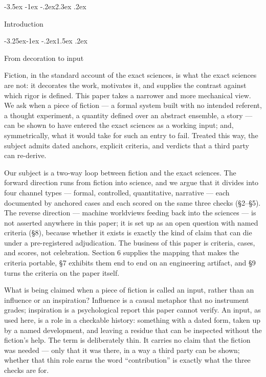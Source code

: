\documentclass[11pt,a4paper]{article}
\makeatletter
\renewcommand\section{\@startsection{section}{1}{\z@}%
  {-3.5ex \@plus -1ex \@minus -.2ex}{2.3ex \@plus .2ex}%
  {\normalfont\Large\bfseries\raggedright}}
\renewcommand\subsection{\@startsection{subsection}{2}{\z@}%
  {-3.25ex\@plus -1ex \@minus -.2ex}{1.5ex \@plus .2ex}%
  {\normalfont\large\bfseries\raggedright}}
\makeatother
\begin{document}
\section{Introduction}

\subsection{From decoration to input}

Fiction, in the standard account of the exact sciences, is what the exact sciences are not: it decorates the work, motivates it, and supplies the contrast against which rigor is defined. This paper takes a narrower and more mechanical view. We ask when a piece of fiction — a formal system built with no intended referent, a thought experiment, a quantity defined over an abstract ensemble, a story — can be shown to have entered the exact sciences as a working input; and, symmetrically, what it would take for such an entry to fail. Treated this way, the subject admits dated anchors, explicit criteria, and verdicts that a third party can re-derive.

Our subject is a two-way loop between fiction and the exact sciences. The forward direction runs from fiction into science, and we argue that it divides into four channel types — formal, controlled, quantitative, narrative — each documented by anchored cases and each scored on the same three checks (§2–§5). The reverse direction — machine worldviews feeding back into the sciences — is not asserted anywhere in this paper; it is set up as an open question with named criteria (§8), because whether it exists is exactly the kind of claim that can die under a pre-registered adjudication. The business of this paper is criteria, cases, and scores, not celebration. Section 6 supplies the mapping that makes the criteria portable, §7 exhibits them end to end on an engineering artifact, and §9 turns the criteria on the paper itself.

What is being claimed when a piece of fiction is called an input, rather than an influence or an inspiration? Influence is a causal metaphor that no instrument grades; inspiration is a psychological report this paper cannot verify. An input, as used here, is a role in a checkable history: something with a dated form, taken up by a named development, and leaving a residue that can be inspected without the fiction's help. The term is deliberately thin. It carries no claim that the fiction was needed --- only that it was there, in a way a third party can be shown; whether that thin role earns the word ``contribution'' is exactly what the three checks are for.
\end{document}
